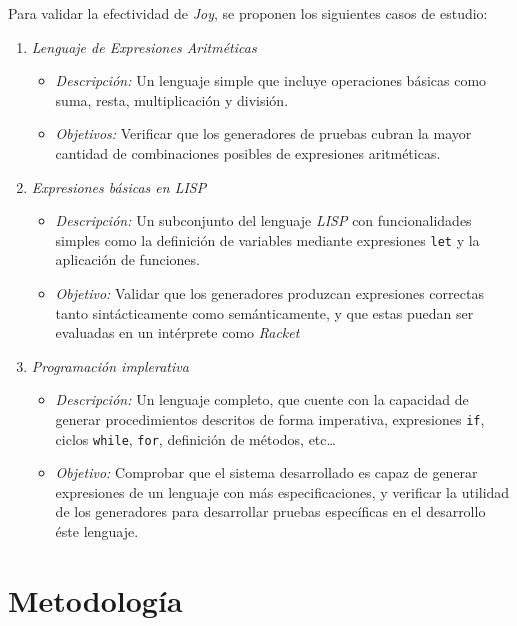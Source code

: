 \documentclass[12pt]{article}
\begin{document}
Para validar la efectividad de \textit{Joy}, se proponen los siguientes casos de estudio:

\begin{enumerate}
\item \textit{Lenguaje de Expresiones Aritméticas}

  \begin{itemize}
  \item \textit{Descripción:} Un lenguaje simple que incluye operaciones básicas como suma, resta, multiplicación y división.
  \item \textit{Objetivos:} Verificar que los generadores de pruebas cubran la mayor cantidad de combinaciones posibles de expresiones aritméticas.
  \end{itemize}
  
\item \textit{Expresiones básicas en LISP}

  \begin{itemize}
  \item \textit{Descripción:} Un subconjunto del lenguaje \textit{LISP} con funcionalidades simples como la definición de variables mediante expresiones \texttt{let} y la aplicación de funciones.
  \item \textit{Objetivo:} Validar que los generadores produzcan expresiones correctas tanto sintácticamente como semánticamente, y que estas puedan ser evaluadas en un intérprete como \textit{Racket}
  \end{itemize}

\item \textit{Programación implerativa}

  \begin{itemize}
  \item \textit{Descripción:} Un lenguaje completo, que cuente con la capacidad de generar procedimientos descritos de forma imperativa, expresiones \texttt{if}, ciclos \texttt{while}, \texttt{for}, definición de métodos, etc\ldots
  \item \textit{Objetivo:} Comprobar que el sistema desarrollado es capaz de generar expresiones de un lenguaje con más especificaciones, y verificar la utilidad de los generadores para desarrollar pruebas específicas en el desarrollo éste lenguaje.
  \end{itemize}
  
\end{enumerate}

\section*{Metodología}
\end{document}
